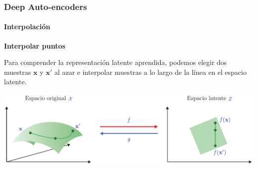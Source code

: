 \documentclass[aspectratio=169]{beamer}
\newenvironment{blockm}[1]{%
  \begin{block}{\textbf{#1}}%
  }{%
  \end{block}%
  \vspace{1em}%
}
\begin{document}

\begin{frame}[t]\frametitle{Deep Auto-encoders}\framesubtitle{Interpolación}
  \begin{blockm}{Interpolar puntos}
    Para comprender la representación latente aprendida, podemos elegir dos muestras $\mathbf{x}$ y $\mathbf{x}'$ al azar e interpolar muestras a lo largo de la línea en el espacio latente.
  \end{blockm}  
  \vspace{.3cm}
  \includegraphics[width=.78\textwidth, center]{imgs/tema4/aenc/interpol_c.pdf}\\
\end{frame}

\end{document}

